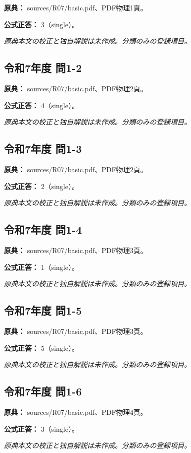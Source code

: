 \noindent\textbf{原典：} sources/R07/basic.pdf、PDF物理1頁。

\textbf{公式正答：} 3（single）。

\par\textit{原典本文の校正と独自解説は未作成。分類のみの登録項目。}

\subsection{令和7年度 問1-2}
\label{q:r07-reg-basic-1-2}

\noindent\textbf{原典：} sources/R07/basic.pdf、PDF物理2頁。

\textbf{公式正答：} 4（single）。

\par\textit{原典本文の校正と独自解説は未作成。分類のみの登録項目。}

\subsection{令和7年度 問1-3}
\label{q:r07-reg-basic-1-3}

\noindent\textbf{原典：} sources/R07/basic.pdf、PDF物理2頁。

\textbf{公式正答：} 2（single）。

\par\textit{原典本文の校正と独自解説は未作成。分類のみの登録項目。}

\subsection{令和7年度 問1-4}
\label{q:r07-reg-basic-1-4}

\noindent\textbf{原典：} sources/R07/basic.pdf、PDF物理3頁。

\textbf{公式正答：} 1（single）。

\par\textit{原典本文の校正と独自解説は未作成。分類のみの登録項目。}

\subsection{令和7年度 問1-5}
\label{q:r07-reg-basic-1-5}

\noindent\textbf{原典：} sources/R07/basic.pdf、PDF物理3頁。

\textbf{公式正答：} 5（single）。

\par\textit{原典本文の校正と独自解説は未作成。分類のみの登録項目。}

\subsection{令和7年度 問1-6}
\label{q:r07-reg-basic-1-6}

\noindent\textbf{原典：} sources/R07/basic.pdf、PDF物理4頁。

\textbf{公式正答：} 3（single）。

\par\textit{原典本文の校正と独自解説は未作成。分類のみの登録項目。}
